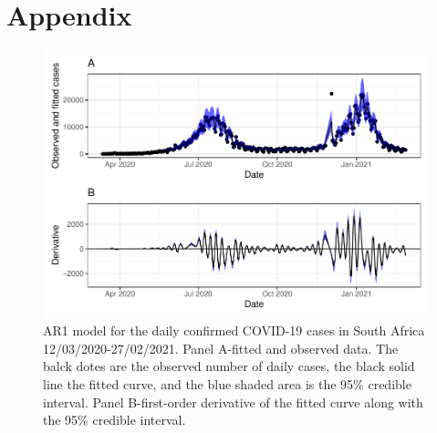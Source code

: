 \documentclass[10pt,letterpaper]{article}
\begin{document}
\newpage

\hypertarget{appendix}{%
\section{Appendix}\label{appendix}}

\setcounter{table}{0} \renewcommand{\thetable}{S\arabic{table}} \setcounter{figure}{0} \renewcommand{\thefigure}{S\arabic{figure}}

\begin{figure}[h]
	\includegraphics[width=0.99\linewidth]{COVIDincidenceSA_files/figure-latex/unnamed-chunk-6-1} \caption{AR1 model for the daily confirmed COVID-19 cases in South Africa 12/03/2020-27/02/2021.  Panel A-fitted and observed data. The balck dotes are the observed number of daily cases, the black solid line the fitted curve, and the blue shaded area is the 95\% credible interval. Panel B-first-order derivative of the fitted curve along with the 95\% credible interval.}\label{fig:unnamed-chunk-6}
\end{figure}
\end{document}
